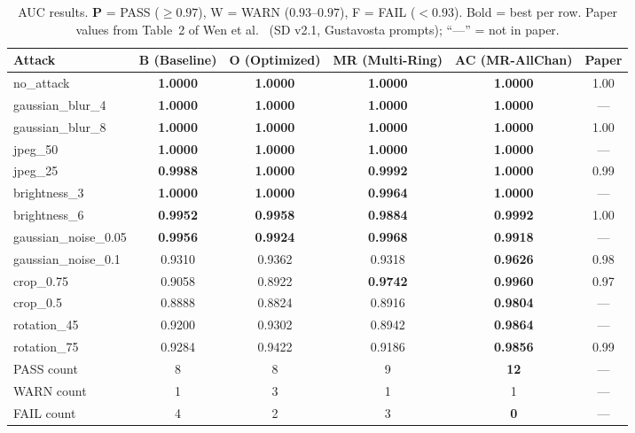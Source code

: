 \documentclass[10pt,twocolumn]{article}
\newcommand{\pass}[1]{\textcolor{passgreen}{\textbf{#1}}}
\newcommand{\warn}[1]{\textcolor{warnamber}{#1}}
\newcommand{\fail}[1]{\textcolor{failred}{#1}}
\begin{document}
\begin{table}[tp]
  \centering
  \caption{AUC results. \pass{P} = PASS ($\geq 0.97$),
    \warn{W} = WARN ($0.93$--$0.97$), \fail{F} = FAIL ($< 0.93$).
    Bold = best per row.
    Paper values from Table~2 of Wen et al.~\cite{wen2023treering}
    (SD v2.1, Gustavosta prompts); ``---'' = not in paper.}
  \label{tab:auc}
  \setlength{\tabcolsep}{5pt}
  \begin{tabular}{lccccc}
    \toprule
    \textbf{Attack}
      & \textbf{B (Baseline)}
      & \textbf{O (Optimized)}
      & \textbf{MR (Multi-Ring)}
      & \textbf{AC (MR-AllChan)}
      & \textbf{Paper} \\
    \midrule
    no\_attack
      & \pass{1.0000} & \pass{1.0000} & \pass{1.0000} & \pass{\bf 1.0000} & 1.00 \\
    gaussian\_blur\_4
      & \pass{1.0000} & \pass{1.0000} & \pass{1.0000} & \pass{\bf 1.0000} & --- \\
    gaussian\_blur\_8
      & \pass{1.0000} & \pass{1.0000} & \pass{1.0000} & \pass{\bf 1.0000} & 1.00 \\
    jpeg\_50
      & \pass{1.0000} & \pass{1.0000} & \pass{1.0000} & \pass{\bf 1.0000} & --- \\
    jpeg\_25
      & \pass{0.9988} & \pass{1.0000} & \pass{0.9992} & \pass{\bf 1.0000} & 0.99 \\
    brightness\_3
      & \pass{1.0000} & \pass{1.0000} & \pass{0.9964} & \pass{\bf 1.0000} & --- \\
    brightness\_6
      & \pass{0.9952} & \pass{0.9958} & \pass{0.9884} & \pass{\bf 0.9992} & 1.00 \\
    gaussian\_noise\_0.05
      & \pass{0.9956} & \pass{0.9924} & \pass{\bf 0.9968} & \pass{0.9918} & --- \\
    gaussian\_noise\_0.1
      & \warn{0.9310} & \warn{0.9362} & \warn{0.9318} & \warn{\bf 0.9626} & 0.98 \\
    crop\_0.75
      & \fail{0.9058} & \fail{0.8922} & \pass{0.9742} & \pass{\bf 0.9960} & 0.97 \\
    crop\_0.5
      & \fail{0.8888} & \fail{0.8824} & \fail{0.8916} & \pass{\bf 0.9804} & --- \\
    rotation\_45
      & \fail{0.9200} & \warn{0.9302} & \fail{0.8942} & \pass{\bf 0.9864} & --- \\
    rotation\_75
      & \warn{0.9284} & \warn{0.9422} & \fail{0.9186} & \pass{\bf 0.9856} & 0.99 \\
    \midrule
    PASS count & 8 & 8 & 9 & \textbf{12} & --- \\
    WARN count & 1 & 3 & 1 & 1            & --- \\
    FAIL count & 4 & 2 & 3 & \textbf{0}  & --- \\
    \bottomrule
  \end{tabular}
\end{table}
\end{document}
